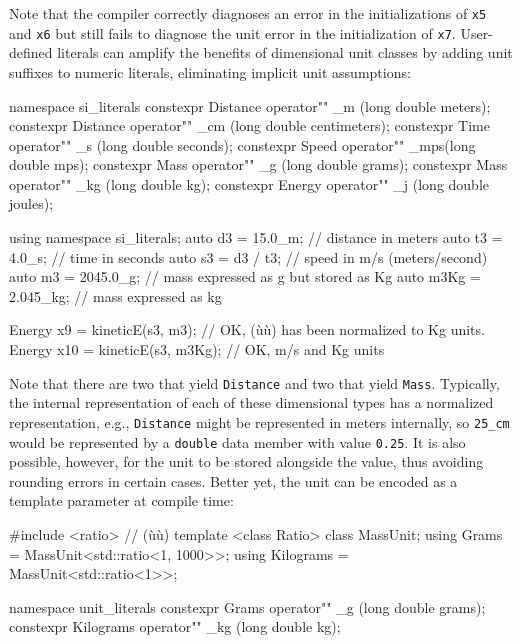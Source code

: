 \noindent Note that the compiler correctly diagnoses an error in the
initializations of \lstinline!x5! and \lstinline!x6! but still fails to
diagnose the unit error in the initialization of \lstinline!x7!.
User-defined literals can amplify the benefits of dimensional unit
classes by adding unit suffixes to numeric literals, eliminating
implicit unit assumptions:

\begin{emcppslisting}[emcppsbatch=e20]
namespace si_literals
{
    constexpr Distance operator"" _m  (long double meters);
    constexpr Distance operator"" _cm (long double centimeters);
    constexpr Time     operator"" _s  (long double seconds);
    constexpr Speed    operator"" _mps(long double mps);
    constexpr Mass     operator"" _g  (long double grams);
    constexpr Mass     operator"" _kg (long double kg);
    constexpr Energy   operator"" _j  (long double joules);
}

using namespace si_literals;
auto d3   = 15.0_m;    // distance in meters
auto t3   = 4.0_s;     // time in seconds
auto s3   = d3 / t3;   // speed in m/s (meters/second)
auto m3   = 2045.0_g;  // mass expressed as g but stored as Kg
auto m3Kg = 2.045_kg;  // mass expressed as kg

Energy x9  = kineticE(s3, m3);    // OK, (ù{}ù) has been normalized to Kg units.
Energy x10 = kineticE(s3, m3Kg);  // OK, m/s and Kg units
\end{emcppslisting}
    
\noindent Note that there are two  that yield \lstinline!Distance! and
two  that yield \lstinline!Mass!. Typically, the internal
representation of each of these dimensional types has a normalized
representation, e.g., \lstinline!Distance! might be represented in meters
internally, so \lstinline!25_cm! would be represented by a \lstinline!double!
data member with value \lstinline!0.25!. It is also possible, however, for
the unit to be stored alongside the value, thus avoiding rounding errors
in certain cases. Better yet, the unit can be encoded as a template
parameter at compile time:

\begin{emcppslisting}
#include <ratio>  // (ù{}ù)
template <class Ratio> class MassUnit;
using Grams     = MassUnit<std::ratio<1, 1000>>;
using Kilograms = MassUnit<std::ratio<1>>;

namespace unit_literals
{
    constexpr Grams     operator"" _g  (long double grams);
    constexpr Kilograms operator"" _kg (long double kg);
}
\end{emcppslisting}
    
